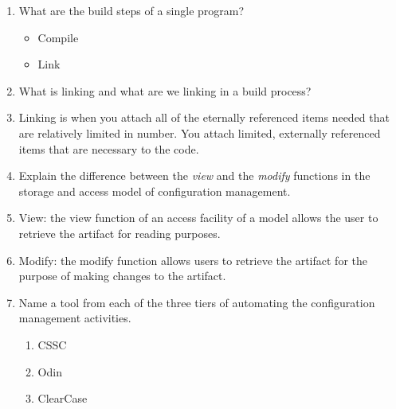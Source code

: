 \documentclass[11pt]{article}
\begin{document}
\begin{enumerate}
    \item What are the build steps of a single program?
    \begin{itemize}
        \item Compile
        \item Link
    \end{itemize}
    
    \item What is linking and what are we linking in a build process?
    \item[] Linking is when you attach all of the eternally referenced items needed that are relatively limited in number. You attach limited, externally referenced items that are necessary to the code.
    
    \item Explain the difference between the \textit{view} and the \textit{modify} functions in the storage and access model of configuration management.
    \item[] View: the view function of an access facility of a model allows the user to retrieve the artifact for reading purposes. 
    
    \item[] Modify: the modify function allows users to retrieve the artifact for the purpose of making changes to the artifact. 
    
    \item Name a tool from each of the three tiers of automating the configuration management activities.
    \begin{enumerate}
        \item CSSC
        \item Odin
        \item ClearCase
    \end{enumerate}
    
    
    \end{enumerate}
    
    
\end{document}
